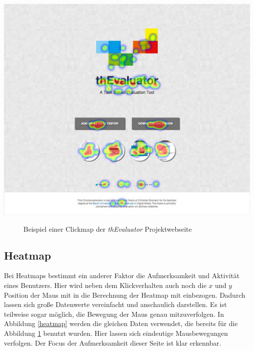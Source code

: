 \vspace{0.3cm}
\begin{center}
\includegraphics[scale=0.35]{./images/clickmap}
\end{center}
\begin{figure}[htb]
   \centering
   \caption{Beispiel einer Clickmap der \textit{thEvaluator} Projektwebseite}
    \label{clickmap}
\end{figure}


\subsection{Heatmap}

Bei Heatmaps bestimmt ein anderer Faktor die Aufmerksamkeit und Aktivität eines Benutzers. Hier wird neben dem Klickverhalten auch noch die $ x $ und $ y $ Position der Maus mit in die Berechnung der Heatmap mit einbezogen. Dadurch lassen sich große Datenwerte vereinfacht und anschaulich darstellen. Es ist teilweise sogar möglich, die Bewegung der Maus genau mitzuverfolgen. In Abbildung \ref{heatmap} werden die gleichen Daten verwendet, die bereits für die Abbildung \ref{clickmap} benutzt wurden. Hier lassen sich eindeutige Mausbewegungen verfolgen. Der Focus der Aufmerksamkeit dieser Seite ist klar erkennbar.

